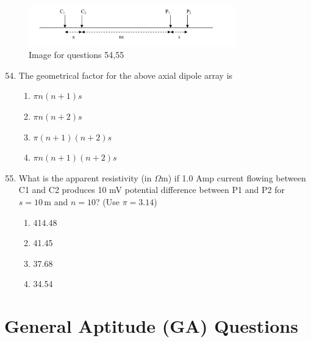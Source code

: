 \documentclass[journal,12pt,onecolumn]{IEEEtran}
\theoremstyle{remark}
\begin{document}
\begin{figure}[H]
    \centering
    \includegraphics[width=0.8\textwidth]{figs/fig11.png}
    \caption{Image for questions 54,55}
    \label{fig:question54,55}
\end{figure}

\begin{enumerate}
\setcounter{enumi}{53}


\item The geometrical factor for the above axial dipole array is  
\begin{multicols}{4}
\begin{enumerate}
\item \(\pi n (n+1) s\)  
\item \(\pi n (n+2) s\)  
\item \(\pi (n+1)(n+2) s\)  
\item \(\pi n (n+1)(n+2) s\)  
\end{enumerate}
\end{multicols}

\item What is the apparent resistivity (in \(\Omega\)m) if 1.0 Amp current flowing between C1 and C2 produces 10 mV potential difference between P1 and P2 for \(s = 10\, \text{m}\) and \(n = 10\)? (Use \(\pi = 3.14\))  
\begin{multicols}{4}
\begin{enumerate}
\item 414.48  
\item 41.45  
\item 37.68  
\item 34.54  
\end{enumerate}
\end{multicols}

\end{enumerate}

\newpage
\section*{\textbf{General Aptitude (GA) Questions }}
\vspace{0.5cm}
\end{document}
